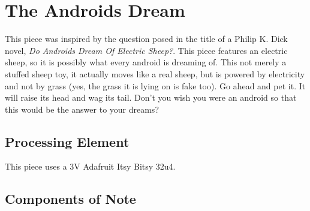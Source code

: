 %
%
%
%
% 
%
%
%
%
%
% 
%

\section{The Androids Dream}

This piece was inspired by the question posed in the title of a Philip K. Dick
novel, \textit{Do Androids Dream Of Electric Sheep?}. This piece features an
electric sheep, so it is possibly what every android is dreaming of. This not
merely a stuffed sheep toy, it actually moves like a real sheep, but is
powered by electricity and not by grass (yes, the grass it is lying on is fake
too). Go ahead and pet it. It will raise its head and wag its tail. Don't you
wish you were an android so that this would be the answer to your dreams?

\subsection*{Processing Element}

This piece uses a 3V Adafruit Itsy Bitsy 32u4.

\subsection*{Components of Note}

